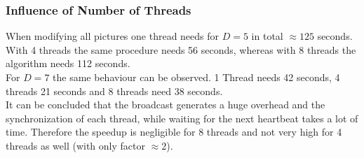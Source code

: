 \documentclass{article}
\begin{document}
\begin{adjustwidth}{2em}{2em}
\begin{adjustwidth}{2em}{2em}
			\subsubsection{Influence of Number of Threads}
			\begin{adjustwidth}{1em}{}
				When modifying all pictures one thread needs for $D = 5$ in total $\approx 125$ seconds. With 4 threads the same procedure needs 56 seconds, whereas with 8 threads the algorithm needs 112 seconds. \\
				For $D = 7$ the same behaviour can be observed. 1 Thread needs 42 seconds, 4 threads 21 seconds and 8 threads need 38 seconds. \\
				It can be concluded that the broadcast generates a huge overhead and the synchronization of each thread, while waiting for the next heartbeat takes a lot of time. Therefore the speedup is negligible for 8 threads and not very high for 4 threads as well (with only factor $\approx 2$).
			\end{adjustwidth}
		\end{adjustwidth}
    \end{adjustwidth}
    
\end{document}
